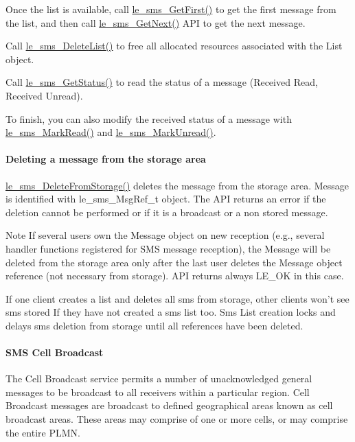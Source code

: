 Once the list is available, call {\ttfamily \hyperlink{le__sms__interface_8h_a934253dee33a6090656876cff853b2c6}{le\+\_\+sms\+\_\+\+Get\+First()}} to get the first message from the list, and then call {\ttfamily \hyperlink{le__sms__interface_8h_ac3b6a30a6d4e4f21749b536184b836ec}{le\+\_\+sms\+\_\+\+Get\+Next()}} A\+PI to get the next message.

Call {\ttfamily \hyperlink{le__sms__interface_8h_a4027c05c4ee7552ab0e081caa315c8a2}{le\+\_\+sms\+\_\+\+Delete\+List()}} to free all allocated resources associated with the List object.

Call {\ttfamily \hyperlink{le__sms__interface_8h_ae1843c72eca77cd6da94cb686e5c2ae8}{le\+\_\+sms\+\_\+\+Get\+Status()}} to read the status of a message (Received Read, Received Unread).

To finish, you can also modify the received status of a message with {\ttfamily \hyperlink{le__sms__interface_8h_a3dbd11952804520512fed270d183461d}{le\+\_\+sms\+\_\+\+Mark\+Read()}} and {\ttfamily \hyperlink{le__sms__interface_8h_a6ef04e331af6563b79e77bb51b28bc55}{le\+\_\+sms\+\_\+\+Mark\+Unread()}}.\hypertarget{c_sms_le_sms_ops_deleting}{}\paragraph{Deleting a message from the storage area}\label{c_sms_le_sms_ops_deleting}
{\ttfamily \hyperlink{le__sms__interface_8h_aff755186b683b94ba2788b48e28284a3}{le\+\_\+sms\+\_\+\+Delete\+From\+Storage()}} deletes the message from the storage area. Message is identified with {\ttfamily le\+\_\+sms\+\_\+\+Msg\+Ref\+\_\+t} object. The A\+PI returns an error if the deletion cannot be performed or if it is a broadcast or a non stored message.

\begin{DoxyNote}{Note}
If several users own the Message object on new reception (e.\+g., several handler functions registered for S\+MS message reception), the Message will be deleted from the storage area only after the last user deletes the Message object reference (not necessary from storage). A\+PI returns always L\+E\+\_\+\+OK in this case.

If one client creates a list and deletes all sms from storage, other clients won’t see sms stored If they have not created a sms list too. Sms List creation locks and delays sms deletion from storage until all references have been deleted.
\end{DoxyNote}
\hypertarget{c_sms_le_sms_ops_broadcast}{}\paragraph{S\+M\+S Cell Broadcast}\label{c_sms_le_sms_ops_broadcast}
The Cell Broadcast service permits a number of unacknowledged general messages to be broadcast to all receivers within a particular region. Cell Broadcast messages are broadcast to defined geographical areas known as cell broadcast areas. These areas may comprise of one or more cells, or may comprise the entire P\+L\+MN.

